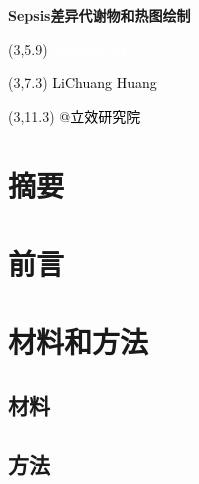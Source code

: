 \documentclass[
]{article}
\author{}
\date{\vspace{-2.5em}}
\begin{document}
\begin{titlepage} 
\begin{center} \textbf{\Huge
Sepsis差异代谢物和热图绘制} \vspace{4em}
\begin{textblock}{10}(3,5.9) \huge
\textbf{\textcolor{white}{2024-03-04}}
\end{textblock} \begin{textblock}{10}(3,7.3)
\Large \textcolor{black}{LiChuang Huang}
\end{textblock} \begin{textblock}{10}(3,11.3)
\Large \textcolor{black}{@立效研究院}
\end{textblock} \end{center} \end{titlepage}
\restoregeometry


\tableofcontents

\listoffigures

\listoftables

\newpage


\hypertarget{abstract}{%
\section{摘要}\label{abstract}}

\hypertarget{introduction}{%
\section{前言}\label{introduction}}

\hypertarget{methods}{%
\section{材料和方法}\label{methods}}

\hypertarget{ux6750ux6599}{%
\subsection{材料}\label{ux6750ux6599}}

\hypertarget{ux65b9ux6cd5}{%
\subsection{方法}\label{ux65b9ux6cd5}}
\end{document}
